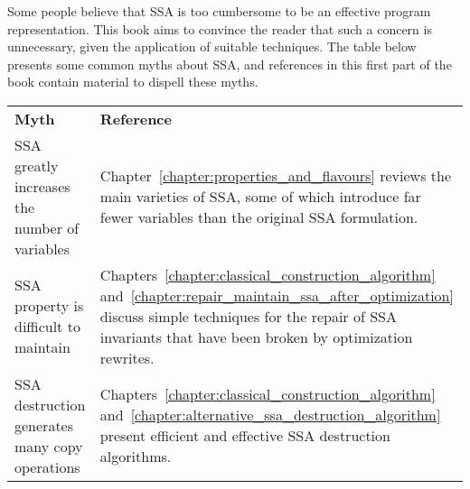 Some people believe that SSA is too cumbersome to be an effective program representation. 
This book aims to convince the reader that such a concern is unnecessary, given the application of suitable techniques. 
The table below presents some common myths about SSA, and references in this first part of the book contain material to dispell these myths.

\begin{center}
\small
\begin{tabular}{p{}@{\kern.05\textwidth}@{\kern.05\textwidth}p{}}
  \hfil \textbf{Myth}\hfil & \hfil \textbf{Reference} \hfil \\[2ex]%
\hspace{.39\textwidth}\penalty0
SSA greatly increases the number of variables &
Chapter~\ref{chapter:properties_and_flavours} reviews the main varieties of
SSA, some of which introduce far fewer variables
than the original SSA formulation. \\ [1ex]
\hspace{.39\textwidth}\penalty0 SSA property is difficult to maintain & 
Chapters~\ref{chapter:classical_construction_algorithm} and~\ref{chapter:repair_maintain_ssa_after_optimization}  discuss simple techniques 
for the repair of SSA invariants that have been
broken by optimization rewrites.\\ [1ex]
SSA destruction generates many copy operations & 
Chapters~\ref{chapter:classical_construction_algorithm} and~\ref{chapter:alternative_ssa_destruction_algorithm} present efficient and effective SSA destruction algorithms. \\
\end{tabular}
\end{center}

